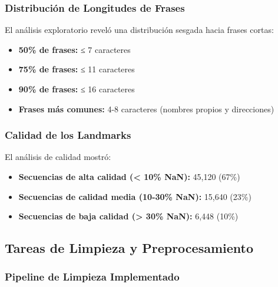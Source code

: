 \documentclass[12pt,a4paper]{article}
\begin{document}
\subsubsection{Distribución de Longitudes de Frases}
El análisis exploratorio reveló una distribución sesgada hacia frases cortas:
\begin{itemize}
    \item \textbf{50\% de frases:} ≤ 7 caracteres
    \item \textbf{75\% de frases:} ≤ 11 caracteres  
    \item \textbf{90\% de frases:} ≤ 16 caracteres
    \item \textbf{Frases más comunes:} 4-8 caracteres (nombres propios y direcciones)
\end{itemize}

\subsubsection{Calidad de los Landmarks}
El análisis de calidad mostró:
\begin{itemize}
    \item \textbf{Secuencias de alta calidad (< 10\% NaN):} 45,120 (67\%)
    \item \textbf{Secuencias de calidad media (10-30\% NaN):} 15,640 (23\%)
    \item \textbf{Secuencias de baja calidad (> 30\% NaN):} 6,448 (10\%)
\end{itemize}

\subsection{Tareas de Limpieza y Preprocesamiento}

\subsubsection{Pipeline de Limpieza Implementado}
\end{document}
